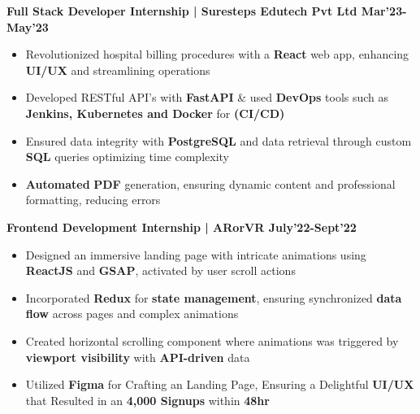 \documentclass[10pt]{article}
\begin{document}
\large {\textbf{Full Stack Developer Internship | Suresteps Edutech Pvt Ltd \normalsize{{\hfill}Mar'23-May'23}}} \normalsize \\[-1.6em]
\begin{itemize}
\setlength\itemsep{-0.2em}
    \item Revolutionized hospital billing procedures with a \textbf{React} web app, enhancing \textbf{UI/UX} and streamlining operations
    \item Developed RESTful API's with \textbf{FastAPI} \& used \textbf{DevOps} tools such as \textbf{Jenkins, Kubernetes and Docker} for \textbf{(CI/CD)}
    \item Ensured data integrity with \textbf{PostgreSQL} and data retrieval through custom \textbf{SQL} queries optimizing time complexity
    \item \textbf{Automated} \textbf{PDF} generation, ensuring dynamic content and professional formatting, reducing errors\\[-1.5em]
\end{itemize}

\large {\textbf{Frontend Development Internship | ARorVR \normalsize{{\hfill}July'22-Sept'22}}} \normalsize
\\[-1.6em]
\begin{itemize}
    \item Designed an immersive landing page with intricate animations using \textbf{ReactJS} and \textbf{GSAP}, activated by user scroll actions\\[-1.9em]
    \item Incorporated \textbf{Redux} for \textbf{state management}, ensuring synchronized \textbf{data flow} across pages and complex animations\\[-1.9em]
    \item Created horizontal scrolling component where animations was triggered by \textbf{viewport visibility} with \textbf{API-driven} data\\[-1.9em]
    \item Utilized \textbf{Figma} for Crafting an Landing Page, Ensuring a Delightful \textbf{UI/UX} that Resulted in an \textbf{4,000 Signups} within \textbf{48hr}\\[-1.5em]
\end{itemize}

\vspace{-1ex}
{\color{headliner} \spacedhrule{0.15ex}{1.0ex}}
\end{document}
